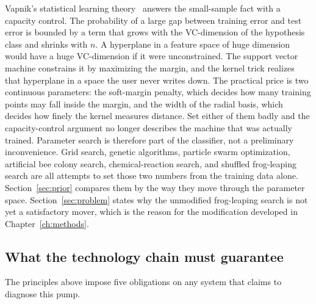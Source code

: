 Vapnik's statistical learning theory~\cite{vapnik1995,cortes1995,cover1965} answers the small-sample fact with a capacity control.
The probability of a large gap between training error and test error is bounded by a term that grows with the VC-dimension of the hypothesis class and shrinks with \(n\).
A hyperplane in a feature space of huge dimension would have a huge VC-dimension if it were unconstrained.
The support vector machine constrains it by maximizing the margin, and the kernel trick realizes that hyperplane in a space the user never writes down.
The practical price is two continuous parameters: the soft-margin penalty, which decides how many training points may fall inside the margin, and the width of the radial basis, which decides how finely the kernel measures distance.
Set either of them badly and the capacity-control argument no longer describes the machine that was actually trained.
Parameter search is therefore part of the classifier, not a preliminary inconvenience.
Grid search, genetic algorithms, particle swarm optimization, artificial bee colony search, chemical-reaction search, and shuffled frog-leaping search are all attempts to set those two numbers from the training data alone.
Section~\ref{sec:prior} compares them by the way they move through the parameter space.
Section~\ref{sec:problem} states why the unmodified frog-leaping search is not yet a satisfactory mover, which is the reason for the modification developed in Chapter~\ref{ch:methods}.

\subsection{What the technology chain must guarantee}

The principles above impose five obligations on any system that claims to diagnose this pump.

